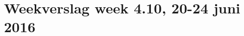 \documentclass[11pt,a4paper]{article}
\begin{document}
\section*{Weekverslag week 4.10, 20-24 juni 2016}




\end{document}
